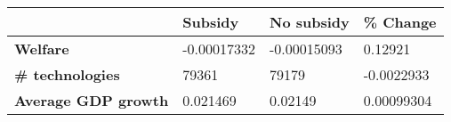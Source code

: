 \begin{tabular}{|l|l|l|l|}
\hline
&\textbf{Subsidy}&\textbf{No subsidy}&\textbf{\% Change}\\\hline
\textbf{Welfare}&-0.00017332&-0.00015093&0.12921\\\hline
\textbf{\# technologies}&79361&79179&-0.0022933\\\hline
\textbf{Average GDP growth}&0.021469&0.02149&0.00099304\\\hline
\end{tabular}

